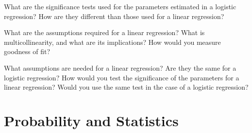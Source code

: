 \documentclass[answers]{exam}
\begin{document}
\begin{questions}
\question %
What are the significance tests used for the parameters estimated in a logistic regression?
How are they different than those used for a linear regression?

\question
What are the assumptions required for a linear regression?
What is multicollinearity, and what are its implications?
How would you measure goodness of fit?

\question
What assumptions are needed for a linear regression?
Are they the same for a logistic regression?
How would you test the significance of the parameters for a linear regression?
Would you use the same test in the case of a logistic regression?
\end{questions}

\section{Probability and Statistics}
\end{document}
